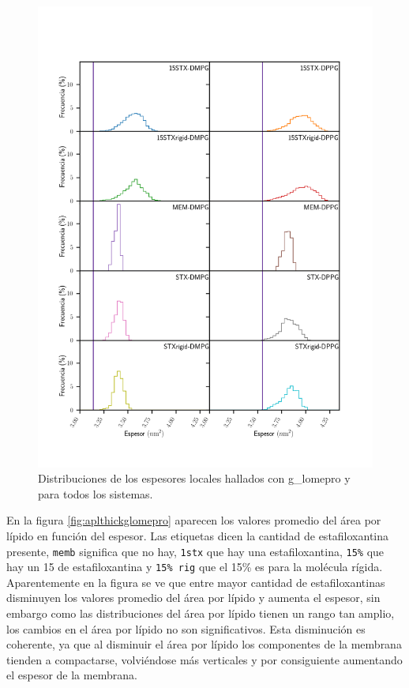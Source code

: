 \begin{figure}
\begin{center}
    \includegraphics[scale=0.3,trim={0 3cm 0 6cm},clip]{Plots/thick_hist_g_lomepro.png}
  \caption{Distribuciones de los espesores locales hallados con g\_lomepro y para todos los sistemas. }
  \label{fig:thicglomepro}
\end{center}
\end{figure}

En la figura \ref{fig:aplthickglomepro} aparecen los valores promedio del \'{a}rea por l\'{i}pido en funci\'{o}n del espesor. Las etiquetas dicen la cantidad de estafiloxantina presente, \texttt{memb} significa que no hay, \texttt{1stx}  que hay una estafiloxantina, \texttt{15\%} que hay un 15 de estafiloxantina y \texttt{15\% rig} que el 15\% es para la mol\'{e}cula r\'{i}gida. Aparentemente en la figura se ve que entre mayor cantidad de estafiloxantinas disminuyen los valores promedio del \'{a}rea por l\'{i}pido y aumenta el espesor, sin embargo como las distribuciones del \'{a}rea por l\'{i}pido tienen un rango tan amplio,  los cambios en el \'{a}rea por l\'{i}pido no son significativos. Esta disminuci\'{o}n es coherente, ya que al disminuir el \'{a}rea por l\'{i}pido los componentes de la membrana tienden a compactarse, volvi\'{e}ndose m\'{a}s verticales y por consiguiente aumentando el espesor de la membrana.\\ 

